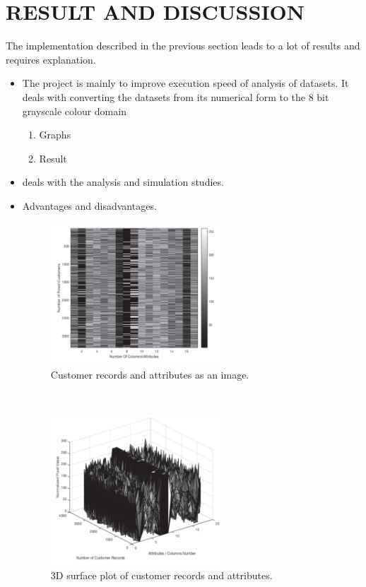 

\chapter{RESULT AND DISCUSSION}

\hspace{0.9cm} The implementation described in the previous section leads to a lot of results and requires explanation.

\begin{itemize}
	\item The project is mainly to improve execution speed of analysis of datasets. It deals with converting the datasets from its numerical form to the 8 bit grayscale colour domain\\
	\begin{enumerate}
		\item Graphs
		\item Result
	\end{enumerate}
%	
%	
	
	\item deals with the analysis and simulation studies.
	\item Advantages and disadvantages.
	\begin{figure}[h!]
		\centering	
		\includegraphics[width=2.5in]{1.png} %
		\caption{Customer records and attributes as an image.}
		\label{fig:1} %
		
	\end{figure}\\
	\begin{figure}[h!]
		\centering	
		\includegraphics[width=2.5in]{2.png} %
		\caption{ 3D surface plot of customer records and attributes.}
		\label{fig:2} %
		

\end{figure}
\end{itemize}
